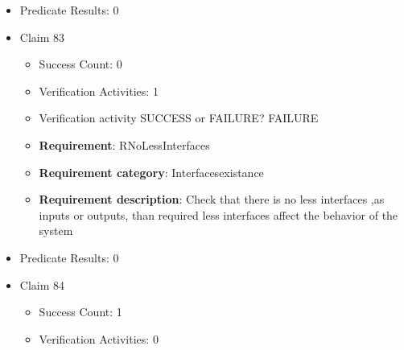 \documentclass{article}
\begin{document}
\begin{itemize}
\begin{itemize}
						\item \textbf{Requirement}: Out052 
						\item \textbf{Requirement category}: Interfacesexistance 
						\item \textbf{Requirement description}: Its unit shall be m/s^2 Defining the output interface ensures correct integration and consistent communication with the simulation platform.
					
					\item Verification activity SUCCESS or FAILURE? SUCCESS
		
						\item \textbf{Requirement}: Out052 
						\item \textbf{Requirement category}: Interfacesexistance 
						\item \textbf{Requirement description}: Its unit shall be m/s^2 Defining the output interface ensures correct integration and consistent communication with the simulation platform.
					
				\end{itemize}
				
									    
				\item Predicate Results: 0

  				  \item Claim 83
				\begin{itemize}
			    	\item Success Count: 0 
			    	\item Verification Activities: 1
					\item Verification activity SUCCESS or FAILURE? FAILURE
		
						\item \textbf{Requirement}: RNoLessInterfaces 
						\item \textbf{Requirement category}: Interfacesexistance 
						\item \textbf{Requirement description}: Check that there is no less interfaces ,as inputs or outputs, than required  less interfaces affect the behavior of the system
					
				\end{itemize}
				
									    
				\item Predicate Results: 0

  				  \item Claim 84
				\begin{itemize}
			    	\item Success Count: 1 
			    	\item Verification Activities: 0
				\end{itemize}
				

\end{itemize}
\end{document}
